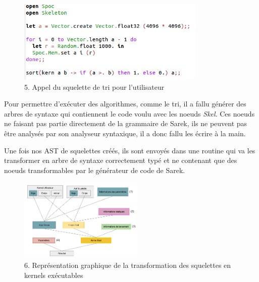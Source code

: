 \documentclass{report}
\begin{document}
\begin{itemize}
\begin{figure}[!h]
\begin{center}
\includegraphics[height=150]{images_finales/sort.png}
\end{center}
\caption{5. Appel du squelette de tri pour l'utilisateur}
\label{test}
\end{figure} \newline

Pour permettre d'exécuter des algorithmes, comme le tri, il a fallu générer des arbres de syntaxe qui contiennent le code voulu avec les noeuds \textit{Skel}. Ces noeuds ne faisant pas partie directement de la grammaire de Sarek, ils ne peuvent pas être analysés par son analyseur syntaxique, il a donc fallu les écrire à la main. \newline

Une fois nos AST de squelettes créés, ils sont envoyés dans une routine qui va les transformer en arbre de syntaxe correctement typé et ne contenant que des noeuds transformables par le générateur de code de Sarek.\newline

\begin{figure}[!h]
\begin{center}
\includegraphics[height=150]{images_finales/fonctionnement_skel.png}
\end{center}
\caption{6. Représentation graphique de la transformation des squelettes en kernels exécutables}
\label{test}
\end{figure} \newline


\end{itemize}
\end{document}
